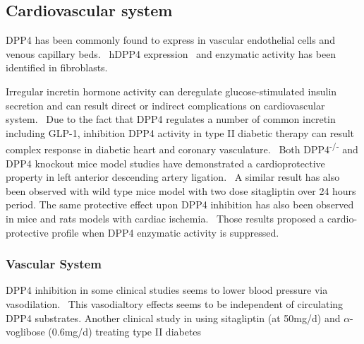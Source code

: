 \subsection{Cardiovascular system}
DPP4 has been commonly found to express in vascular endothelial cells and venous capillary beds.~\cite{Matheeussen2013,Shigeta2012} hDPP4 expression~\cite{Nemoto1999} and enzymatic activity has been identified in fibroblasts.~\cite{Ospelt2010}
\par 
Irregular incretin hormone activity can deregulate glucose-stimulated insulin secretion and can result direct or indirect complications on cardiovascular system.~\cite{Ussher2012} Due to the fact that DPP4 regulates a number of common incretin including GLP-1, inhibition DPP4 activity in type II diabetic therapy can result complex response in diabetic heart and coronary vasculature.~\cite{Ussher2014} Both DPP4\textsuperscript{-/-} and DPP4 knockout mice model studies have demonstrated a cardioprotective property in left anterior descending artery ligation.~\cite{Sauvé2010} A similar result has also been observed with wild type mice model with two dose sitagliptin over 24 hours period. The same protective effect upon DPP4 inhibition has also been observed in mice and rats models with cardiac ischemia.~\cite{Ussher2012} Those results proposed a cardio-protective profile when DPP4 enzymatic activity is suppressed. 
\par 

\subsubsection{Vascular System}
DPP4 inhibition in some clinical studies seems to lower blood pressure via vasodilation.~\cite{Kröller-Schön2012} This vasodialtory effects seems to be independent of circulating DPP4 substrates. Another clinical study in using sitagliptin (at 50mg/d) and $\alpha$-voglibose (0.6mg/d) treating type II diabetes 